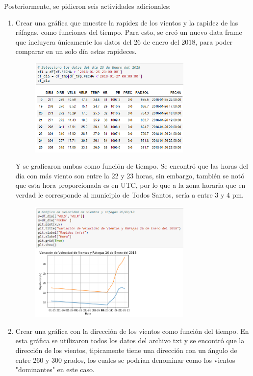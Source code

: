 \documentclass[a4paper]{article}
\begin{document}
Posteriormente, se pidieron seis actividades adicionales:
\begin{enumerate}
\item Crear una gráfica que muestre la rapidez de los vientos y la rapidez de las ráfagas, como funciones del tiempo.
Para esto, se creó un nuevo data frame que incluyera únicamente los datos del 26 de enero del 2018, para poder comparar en un solo día estas rapideces.
\begin{figure}[h!]
  \includegraphics[width=8cm]{1.png}
  \centering
  \label{fig:1}
\end{figure}

Y se graficaron ambas como función de tiempo. Se encontró que las horas del día con más viento son entre la 22 y 23 horas, sin embargo, también se notó que esta hora proporcionada es en UTC, por lo que a la zona horaria que en verdad le corresponde al municipio de Todos Santos, sería a entre 3 y 4 pm. 
\begin{figure}[h!]
  \includegraphics[width=8cm]{2.png}
  \centering
  \label{fig:2}
\end{figure}


\item Crear una gráfica con la dirección de los vientos como función del tiempo. En esta gráfica se utilizaron todos los datos del archivo txt y se encontró que la dirección de los vientos, tipicamente tiene una dirección con un ángulo de entre 260 y 300 grados, los cuales se podrían denominar como los vientos "dominantes" en este caso.


\end{enumerate}
\end{document}
